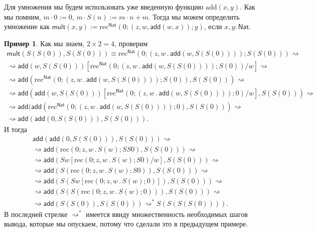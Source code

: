 \documentclass[openany]{book}
\theoremstyle{plain}
\theoremstyle{definition}
\newtheorem{eg}{Пример}[]
\newcommand{\rec}{\mathrm{rec}}
\newcommand{\nat}{\mathsf{Nat}}
\begin{document}
Для умножения мы будем использовать уже введенную функцию \(\mathrm{add}(x, y)\). Как мы помним, \(m \cdot 0 := 0\), \(m \cdot S(n) := m \cdot n + m\). Тогда мы можем определить умножение как \(\mathsf{mult}(x, y) := \mathrm{rec}^{\nat} (0; (z, w, \mathsf{add}(w, x)); y)\), если \(x, y : \nat\).
\begin{eg}
    Как мы знаем, \(2 \times 2 = 4\), проверим
    \begin{align*}\mathsf{mult}(S(S(0)), S(S(0))) \equiv \mathrm{rec}^{\nat} (0; (z, w\,.\, \mathsf{add}(w, S(S(0)))); S(S(0))) \rightsquigarrow\\ \rightsquigarrow \mathsf{add}(w, S(S(0)))[\mathrm{rec}^{\nat} (0; (z, w\,.\, \mathsf{add}(w, S(S(0)))); S(0))/w]\rightsquigarrow\\ \rightsquigarrow \mathsf{add}(\mathrm{rec}^{\nat} (0; (z, w\,.\, \mathsf{add}(w, S(S(0)))); S(0)), S(S(0)))\rightsquigarrow \\ \rightsquigarrow  \mathsf{add}(\mathsf{add}(w, S(S(0)))[\mathrm{rec}^{\nat} (0; (z, w\,.\, \mathsf{add}(w, S(S(0)))); 0)/w], S(S(0)))\rightsquigarrow\\\rightsquigarrow \mathsf{add}(\mathsf{add}(\mathrm{rec}^{\nat} (0; (z, w\,.\, \mathsf{add}(w, S(S(0)))); 0), S(S(0))) \rightsquigarrow\\\rightsquigarrow \mathsf{add}(\mathsf{add}(0, S(S(0))), S(S(0))). \end{align*}
    И тогда
    \begin{align*}
        \mathsf{add}(\mathsf{add}(0, S(S(0))), S(S(0))) \rightsquigarrow\\\rightsquigarrow \mathsf{add}(\rec(0; z, w\,.\, S(w); SS0), S(S(0))) \rightsquigarrow\\\rightsquigarrow \mathsf{add}(Sw[\rec(0; z, w\,.\, S(w); S0)/w], S(S(0))) \rightsquigarrow\\\rightsquigarrow \mathsf{add}(S(\rec(0; z, w\,.\, S(w); S0)), S(S(0))) \rightsquigarrow\\\rightsquigarrow \mathsf{add}(S(Sw[\rec(0; z, w\,.\, S(w); 0)]), S(S(0))) \rightsquigarrow\\\rightsquigarrow \mathsf{add}(S(S(\rec(0; z, w\,.\, S(w); 0))), S(S(0))) \rightsquigarrow\\\rightsquigarrow \mathsf{add}(S(S(0)), S(S(0))) \rightsquigarrow^* S(S(S(S(0)))).
    \end{align*}
    В последней стрелке \(\rightsquigarrow^*\) имеется ввиду множественность необходимых шагов вывода, которые мы опускаем, потому что сделали это в предыдущем примере.

\end{eg}
\end{document}
